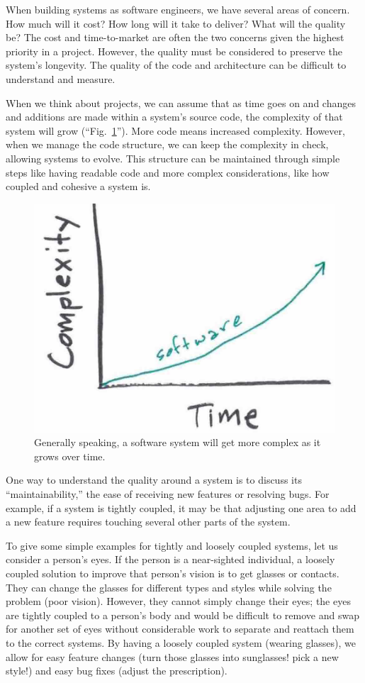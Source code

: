 \documentclass[12pt,conference]{IEEEtran}
\begin{document}
When building systems as software engineers, we have several areas of concern. How much will it cost? How long will it take to deliver? What will the quality be? The cost and time-to-market are often the two concerns given the highest priority in a project. However, the quality must be considered to preserve the system's longevity. The quality of the code and architecture can be difficult to understand and measure.

When we think about projects, we can assume that as time goes on and changes and additions are made within a system's source code, the complexity of that system will grow (``Fig.~\ref{figTimeAndComplexity}''). More code means increased complexity. However, when we manage the code structure, we can keep the complexity in check, allowing systems to evolve. This structure can be maintained through simple steps like having readable code and more complex considerations, like how coupled and cohesive a system is.

\begin{figure}[ht]
    \centerline{
        \includegraphics[width=0.7\columnwidth]{TimeAndComplexity}
    }
    \caption{Generally speaking, a software system will get more complex as it grows over time.}
    \label{figTimeAndComplexity}
\end{figure}

One way to understand the quality around a system is to discuss its ``maintainability,'' the ease of receiving new features or resolving bugs. For example, if a system is tightly coupled, it may be that adjusting one area to add a new feature requires touching several other parts of the system.

To give some simple examples for tightly and loosely coupled systems, let us consider a person's eyes. If the person is a near-sighted individual, a loosely coupled solution to improve that person's vision is to get glasses or contacts. They can change the glasses for different types and styles while solving the problem (poor vision). However, they cannot simply change their eyes; the eyes are tightly coupled to a person's body and would be difficult to remove and swap for another set of eyes without considerable work to separate and reattach them to the correct systems. By having a loosely coupled system (wearing glasses), we allow for easy feature changes (turn those glasses into sunglasses! pick a new style!) and easy bug fixes (adjust the prescription).
\end{document}

